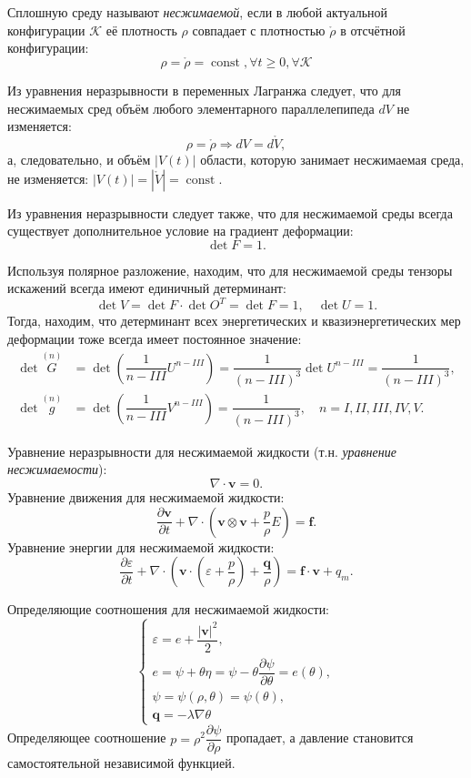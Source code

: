 
\begin{definition}
  Сплошную среду называют \emph{несжимаемой}, если в любой актуальной конфигурации $\mathcal{K}$
  её плотность $\rho$ совпадает с плотностью $\mathring{\rho}$ в отсчётной конфигурации:
  \[
    \rho = \mathring{\rho} = \operatorname{const}, \forall t \geqslant 0, \forall \mathcal{K}
  \]
\end{definition}

Из уравнения неразрывности в переменных Лагранжа следует, что для несжимаемых сред объём любого
элементарного параллелепипеда $dV$ не изменяется:
\[
  \rho = \mathring{\rho} \Rightarrow dV = d\mathring{V},
\]
а, следовательно, и объём $|V(t)|$ области, которую занимает несжимаемая среда, не изменяется:
$|V(t)| = |\mathring{V}| = \operatorname{const}$.

Из уравнения неразрывности следует также, что для несжимаемой среды всегда существует
дополнительное условие на градиент деформации:
\[
  \det F = 1.
\]

Используя полярное разложение, находим, что для несжимаемой среды тензоры искажений всегда имеют 
единичный детерминант:
\[
  \det V = \det F \cdot \det O^T = \det F = 1, \quad \det U = 1.
\]
Тогда, находим, что детерминант всех энергетических и квазиэнергетических мер деформации тоже
всегда имеет постоянное значение:
\begin{align*}
  \det \overset{(n)}{G} &= \det \left( \dfrac{1}{n - III} U^{n - III} \right) = 
  \dfrac{1}{(n-III)^3} \det U^{n - III} = \dfrac{1}{(n-III)^3}, \\
  \det \overset{(n)}{g} &= \det \left( \dfrac{1}{n - III} V^{n - III} \right) = 
  \dfrac{1}{(n-III)^3}, \quad n = I, II, III, IV, V.
\end{align*}

Уравнение неразрывности для несжимаемой жидкости (т.н. \emph{уравнение несжимаемости}):
\[
  \nabla \cdot \mathbf{v} = 0.
\]
Уравнение движения для несжимаемой жидкости:
\[
  \dfrac{\partial \mathbf{v}}{\partial t} + \nabla \cdot \left( \mathbf{v} \otimes \mathbf{v} + \dfrac{p}{\rho} E \right) = \mathbf{f}.
\]
Уравнение энергии для несжимаемой жидкости:
\[
  \dfrac{\partial \varepsilon}{\partial t} + \nabla \cdot \left( \mathbf{v}\cdot \left( \varepsilon+\dfrac{p}{\rho} \right) + \dfrac{\mathbf{q}}{\rho} \right) = \mathbf{f}\cdot\mathbf{v} + q_m.
\]

Определяющие соотношения для несжимаемой жидкости:
\[
  \begin{cases}
    \varepsilon = e + \dfrac{|\mathbf{v}|^2}{2}, \\
    e = \psi + \theta \eta = \psi - \theta \dfrac{\partial \psi}{\partial \theta} = e(\theta), \\
    \psi = \psi(\rho, \theta) = \psi(\theta), \\
    \mathbf{q} = - \lambda \nabla \theta
  \end{cases}
\]
Определяющее соотношение $p = \rho^2 \dfrac{\partial \psi}{\partial \rho}$ пропадает, а
давление становится самостоятельной независимой функцией.


